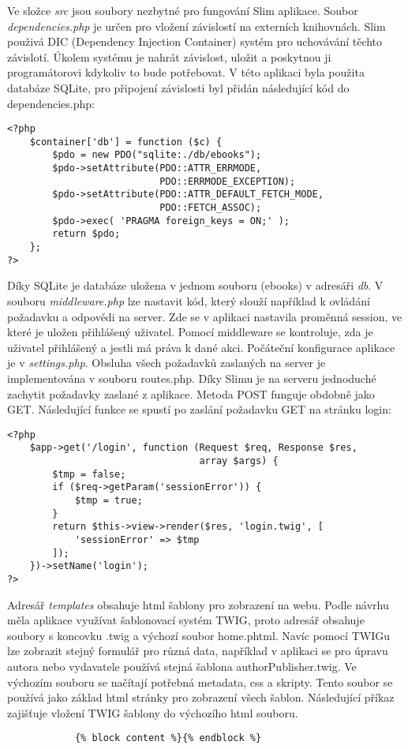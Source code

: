             Ve složce \textit{src} jsou soubory nezbytné pro fungování Slim aplikace. Soubor \textit{dependencies.php} je určen pro vložení závislostí na externích knihovnách. Slim použivá DIC (Dependency Injection Container) systém pro uchovávání těchto závislotí. Úkolem systému je nahrát závislost, uložit a poskytnou ji programátorovi kdykoliv to bude potřebovat. V této aplikaci byla použita databáze SQLite, pro připojení závislosti byl přidán následující kód do dependencies.php:
            \begin{verbatim}
<?php
    $container['db'] = function ($c) {
        $pdo = new PDO("sqlite:./db/ebooks");
        $pdo->setAttribute(PDO::ATTR_ERRMODE, 
                           PDO::ERRMODE_EXCEPTION);
        $pdo->setAttribute(PDO::ATTR_DEFAULT_FETCH_MODE, 
                           PDO::FETCH_ASSOC);
        $pdo->exec( 'PRAGMA foreign_keys = ON;' );
        return $pdo;
    };
?>
            \end{verbatim}
            Díky SQLite je databáze uložena v jednom souboru (ebooks) v adresáři \textit{db}. V souboru \textit{middleware.php} lze nastavit kód, který slouží například k ovládání požadavku a odpovědi na server. Zde se v aplikaci nastavila proměnná session, ve které je uložen přihlášený uživatel. Pomocí middleware se kontroluje, zda je uživatel přihlášený a jestli má práva k dané akci.  Počáteční konfigurace aplikace je v \textit{settings.php}. Obsluha všech požadavků zaslaných na server je implementována v souboru routes.php. Díky Slimu je na serveru jednoduché zachytit požadavky zaslané z aplikace. Metoda POST funguje obdobně jako GET. Následující funkce se spustí po zaslání požadavku GET na stránku login:
            \pagebreak
            \begin{verbatim}
<?php
    $app->get('/login', function (Request $req, Response $res, 
                                  array $args) {
        $tmp = false;
        if ($req->getParam('sessionError')) {
            $tmp = true;
        }
        return $this->view->render($res, 'login.twig', [
            'sessionError' => $tmp
        ]);
    })->setName('login');
?>
            \end{verbatim}
            
            Adresář \textit{templates} obsahuje html šablony pro zobrazení na webu. Podle návrhu měla aplikace využívat šablonovací systém TWIG, proto adresář obsahuje soubory s koncovku .twig a výchozí soubor home.phtml. Navíc pomocí TWIGu lze zobrazit stejný formulář pro různá data, například v aplikaci se pro úpravu autora nebo vydavatele používá stejná šablona authorPublisher.twig. Ve výchozím souboru se načítají potřebná metadata, css a skripty. Tento soubor se používá jako základ html stránky pro zobrazení všech šablon. Následující příkaz zajišťuje vložení TWIG šablony do výchozího html souboru. 
            \begin{lstlisting}
            {% block content %}{% endblock %}
            \end{lstlisting}
             
